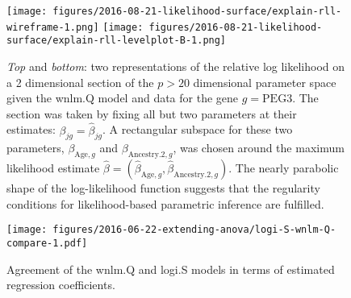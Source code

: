 \documentclass[letterpaper]{article}
\begin{document}
\begin{figure}[h]
\begin{center}
\texttt{[image: figures/2016-08-21-likelihood-surface/explain-rll-wireframe-1.png]}
\texttt{[image: figures/2016-08-21-likelihood-surface/explain-rll-levelplot-B-1.png]}
\end{center}
\caption{
\emph{Top} and \emph{bottom}: two representations of the relative log
likelihood on a 2 dimensional section of the \(p>20\) dimensional parameter
space given the wnlm.Q model and data for the gene \(g=\mathrm{PEG3}\).  The
section was taken by fixing all but two parameters at their estimates:
\(\beta_{jg} = \hat{\beta}_{jg}\).  A rectangular subspace for these two
parameters, \(\beta_{\mathrm{Age},g}\) and  \(\beta_{\mathrm{Ancestry.2},g}\),
was chosen around the maximum likelihood estimate \(\hat{\beta} =
(\hat{\beta}_{\mathrm{Age},g}, \hat{\beta}_{\mathrm{Ancestry.2},g})\).  The
nearly parabolic shape of the log-likelihood function suggests that the
regularity conditions for likelihood-based parametric inference are fulfilled.
}
\label{fig:ll-surf-explain}
\end{figure}

\begin{figure}[h]
\begin{center}
\texttt{[image: figures/2016-06-22-extending-anova/logi-S-wnlm-Q-compare-1.pdf]}
\end{center}
\caption{
Agreement of the wnlm.Q and logi.S models in terms of estimated regression
coefficients.
}
\label{fig:logi.S-wnlm.Q-compare}
\end{figure}
\end{document}
